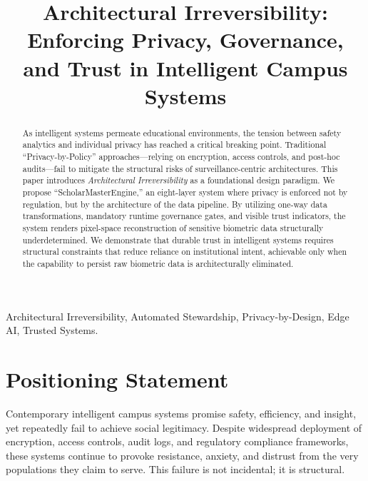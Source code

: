 \documentclass[conference]{IEEEtran}
\begin{document}
\title{Architectural Irreversibility: Enforcing Privacy, Governance, and Trust in Intelligent Campus Systems}

\author{
}

\maketitle

\begin{abstract}
As intelligent systems permeate educational environments, the tension between safety analytics and individual privacy has reached a critical breaking point. Traditional ``Privacy-by-Policy'' approaches---relying on encryption, access controls, and post-hoc audits---fail to mitigate the structural risks of surveillance-centric architectures. This paper introduces \textit{Architectural Irreversibility} as a foundational design paradigm. We propose ``ScholarMasterEngine,'' an eight-layer system where privacy is enforced not by regulation, but by the architecture of the data pipeline. By utilizing one-way data transformations, mandatory runtime governance gates, and visible trust indicators, the system renders pixel-space reconstruction of sensitive biometric data structurally underdetermined. We demonstrate that durable trust in intelligent systems requires structural constraints that reduce reliance on institutional intent, achievable only when the capability to persist raw biometric data is architecturally eliminated.
\end{abstract}

\begin{IEEEkeywords}
Architectural Irreversibility, Automated Stewardship, Privacy-by-Design, Edge AI, Trusted Systems.
\end{IEEEkeywords}

\section*{Positioning Statement}
Contemporary intelligent campus systems promise safety, efficiency, and insight, yet repeatedly fail to achieve social legitimacy. Despite widespread deployment of encryption, access controls, audit logs, and regulatory compliance frameworks, these systems continue to provoke resistance, anxiety, and distrust from the very populations they claim to serve. This failure is not incidental; it is structural.
\end{document}
